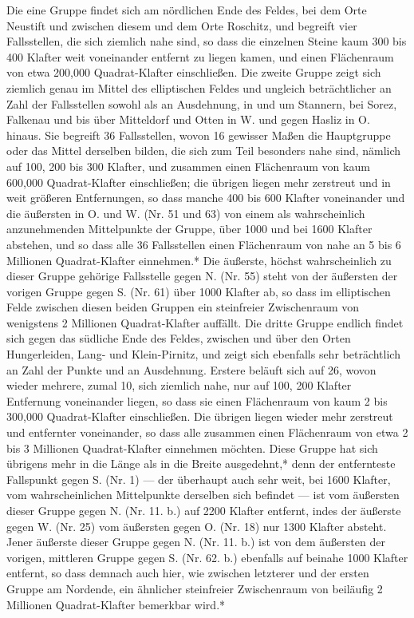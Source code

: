 \documentclass[a4paper, 11pt, oneside, german]{article}
\begin{document}
Die eine Gruppe findet sich am nördlichen Ende des Feldes, bei dem Orte Neustift und zwischen diesem und dem Orte Roschitz, und begreift vier Fallsstellen, die sich ziemlich nahe sind, so dass die einzelnen Steine kaum 300 bis 400 Klafter weit voneinander entfernt zu liegen kamen, und einen Flächenraum von etwa 200,000 Quadrat-Klafter einschließen. Die zweite Gruppe zeigt sich ziemlich genau im Mittel des elliptischen Feldes und ungleich beträchtlicher an Zahl der Fallsstellen sowohl als an Ausdehnung, in und um Stannern, bei Sorez, Falkenau und bis über Mitteldorf und Otten in W. und gegen Hasliz in O. hinaus. Sie begreift 36 Fallsstellen, wovon 16 gewisser Maßen die Hauptgruppe oder das Mittel derselben bilden, die sich zum Teil besonders nahe sind, nämlich auf 100, 200 bis 300 Klafter, und zusammen einen Flächenraum von kaum 600,000 Quadrat-Klafter einschließen; die übrigen liegen mehr zerstreut und in weit größeren Entfernungen, so dass manche 400 bis 600 Klafter voneinander und die äußersten in O. und W. (Nr. 51 und 63) von einem als wahrscheinlich anzunehmenden Mittelpunkte der Gruppe, über 1000 und bei 1600 Klafter abstehen, und so dass alle 36 Fallsstellen einen Flächenraum von nahe an 5 bis 6 Millionen Quadrat-Klafter einnehmen.* Die äußerste, höchst wahrscheinlich zu dieser Gruppe gehörige Fallsstelle gegen N. (Nr. 55) steht von der äußersten der vorigen Gruppe gegen S. (Nr. 61) über 1000 Klafter ab, so dass im elliptischen Felde zwischen diesen beiden Gruppen ein steinfreier Zwischenraum von wenigstens 2 Millionen Quadrat-Klafter auffällt. Die dritte Gruppe endlich findet sich gegen das südliche Ende des Feldes, zwischen und über den Orten Hungerleiden, Lang- und Klein-Pirnitz, und zeigt sich ebenfalls sehr beträchtlich an Zahl der Punkte und an Ausdehnung. Erstere beläuft sich auf 26, wovon wieder mehrere, zumal 10, sich ziemlich nahe, nur auf 100, 200 Klafter Entfernung voneinander liegen, so dass sie einen Flächenraum von kaum 2 bis 300,000 Quadrat-Klafter einschließen. Die übrigen liegen wieder mehr zerstreut und entfernter voneinander, so dass alle zusammen einen Flächenraum von etwa 2 bis 3 Millionen Quadrat-Klafter einnehmen möchten. Diese Gruppe hat sich übrigens mehr in die Länge als in die Breite ausgedehnt,* denn der entfernteste Fallspunkt gegen S. (Nr. 1) --- der überhaupt auch sehr weit, bei 1600 Klafter, vom wahrscheinlichen Mittelpunkte derselben sich befindet --- ist vom äußersten dieser Gruppe gegen N. (Nr. 11. b.) auf 2200 Klafter entfernt, indes der äußerste gegen W. (Nr. 25) vom äußersten gegen O. (Nr. 18) nur 1300 Klafter absteht. Jener äußerste dieser Gruppe gegen N. (Nr. 11. b.) ist von dem äußersten der vorigen, mittleren Gruppe gegen S. (Nr. 62. b.) ebenfalls auf beinahe 1000 Klafter entfernt, so dass demnach auch hier, wie zwischen letzterer und der ersten Gruppe am Nordende, ein ähnlicher steinfreier Zwischenraum von beiläufig 2 Millionen Quadrat-Klafter bemerkbar wird.*
\end{document}
